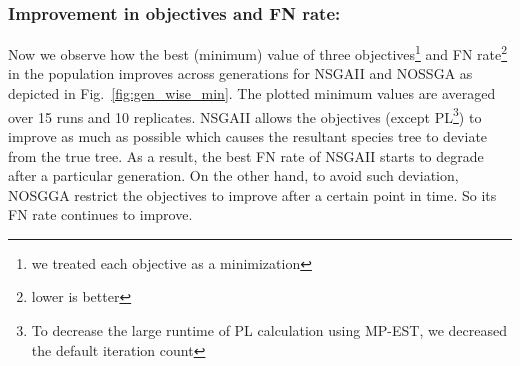 \subsubsection{Improvement in objectives and FN rate:} Now we observe how the best (minimum) value of three objectives\footnote{we treated each objective as a minimization} and FN rate\footnote{lower is better} in the population improves across generations for NSGAII and NOSSGA as depicted in Fig.~\ref{fig:gen_wise_min}. The plotted minimum values are averaged over 15 runs and 10 replicates. NSGAII allows the objectives (except PL\footnote{To decrease the large runtime of PL calculation using MP-EST, we decreased the default iteration count}) to improve as much as possible which causes the resultant species tree to deviate from the true tree. As a result, the best FN rate of NSGAII starts to degrade after a particular generation. On the other hand, to avoid such deviation, NOSGGA restrict the objectives to improve after a certain point in time. So its FN rate continues to improve.
